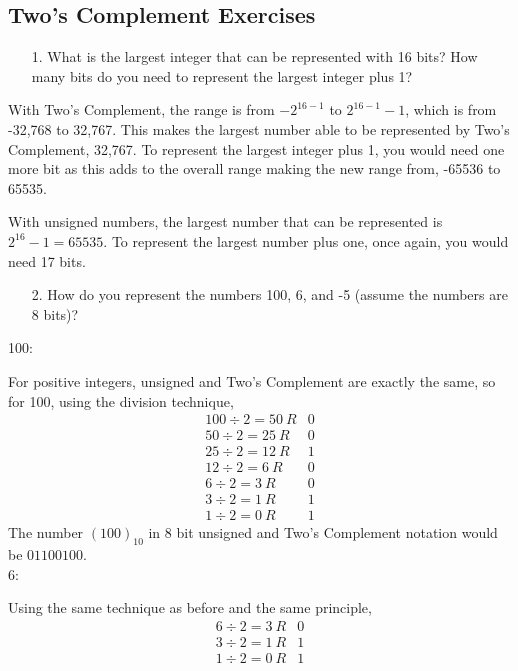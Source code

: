 \documentclass[12pt]{article}
\begin{document}
    \subsection*{Two's Complement Exercises}
    \begin{itemize}
        \item[1.] What is the largest integer that can be represented with 16
            bits? How many bits do you need to represent the largest integer
            plus 1?
    \end{itemize}
    \par With Two's Complement, the range is from $-2^{16-1}$ to $2^{16-1}
    - 1$, which is from -32,768 to 32,767. This makes the largest number able to
    be represented by Two's Complement, 32,767. To represent the largest integer
    plus 1, you would need one more bit as this adds to the overall range making
    the new range from, -65536 to 65535.
    \par With unsigned numbers, the largest number that can be represented is
    $2^{16} - 1 = 65535$. To represent the largest number plus one, once again,
    you would need 17 bits.
    \begin{itemize}
        \item[2.] How do you represent the numbers 100, 6, and -5 (assume the
            numbers are 8 bits)?
    \end{itemize}
    100:
    \par For positive integers, unsigned and Two's Complement are exactly the
    same, so for 100, using the division technique,
    \begin{align*}
        100 \div 2 = 50\ R&0 \\
        50 \div 2 = 25\ R&0 \\
        25 \div 2 = 12\ R&1 \\
        12 \div 2 = 6\ R&0 \\
        6 \div 2 = 3\ R&0 \\
        3 \div 2 = 1\ R&1 \\
        1 \div 2 = 0\ R&1
    \end{align*}
    The number $(100)_{10}$ in 8 bit unsigned and Two's Complement notation
    would be
    $\boxed{01100100.}$ \\
    6:
    \par Using the same technique as before and the same principle,
    \begin{align*}
        6 \div 2 = 3\ R&0 \\
        3 \div 2 = 1\ R&1 \\
        1 \div 2 = 0\ R&1
    \end{align*}
\end{document}
